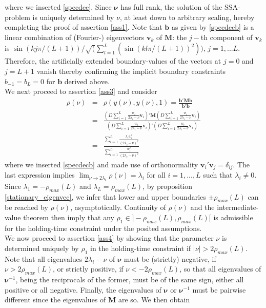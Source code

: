 \documentclass[a4paper]{article}
\begin{document}
where we inserted \ref{specdec}. Since $\boldsymbol{\nu}$ has full rank, the solution of the SSA-problem is uniquely determined by $\nu$, at least down to arbitrary scaling, hereby completing the proof of assertion \ref{ass1}. Note that $\mathbf{b}$ as given by \ref{specdecb} is a linear combination of (Fourier-) eigenvectors $\mathbf{v}_{k}$ of $\mathbf{M}$: the $j-$th component of $\mathbf{v}_k$ is $\sin(kj\pi/(L+1))/\sqrt(\sum_{l=1}^L(\sin(kl\pi/(L+1))^2))$, $j=1,...L$. Therefore, the artificially extended boundary-values of the vectors at $j=0$ and $j=L+1$ vanish thereby confirming the implicit boundary constraints $b_{-1}=b_L=0$ for $\mathbf{b}$ derived above. \\ %
We next proceed to assertion \ref{ass3} and consider
\begin{eqnarray}
\rho(\nu)&=&\rho(y(\nu),y(\nu),1)=\frac{\mathbf{b}'\mathbf{M}\mathbf{b}}{\mathbf{b}'\mathbf{b}}\nonumber\\
&=&\frac{\left(D\sum_{i=1}^L \frac{w_i}{2\lambda_{i }-\nu}\mathbf{v}_i\right)'\mathbf{M}\left(D\sum_{i=1}^L \frac{w_i}{2\lambda_{i }-\nu}\mathbf{v}_i\right)}{\left(D\sum_{i=1}^L \frac{w_i}{2\lambda_{i }-\nu}\mathbf{v}_i\right)'\left(D\sum_{i=1}^L \frac{w_i}{2\lambda_{i }-\nu}\mathbf{v}_i\right)}\nonumber\\
&=&\frac{\sum_{i=1}^L \displaystyle{\frac{\lambda_{i }w_i^2}{(2\lambda_{i }-\nu)^2}}}{\sum_{i=1}^L \displaystyle{\frac{w_i^2}{(2\lambda_{i }-\nu)^2}}}\label{specdecrho}
\end{eqnarray}
where we inserted \ref{specdecb} and made use of orthonormality $\mathbf{v}_i'\mathbf{v}_j=\delta_{ij}$. The last expression implies $\lim_{\nu\to2\lambda_{i }}\rho(\nu)=\lambda_{i }$ for all $i=1,...,L$ such that $\lambda_i\neq 0$. Since  $\lambda_1=-\rho_{max}(L)$ and $\lambda_L=\rho_{max}(L)$, by proposition \ref{stationary_eigenvec}, we infer that lower and upper boundaries $\pm\rho_{max}(L)$ can be reached by $\rho(\nu)$, asymptotically. Continuity of $\rho(\nu)$ and the intermediate-value theorem then imply that any $\rho_1\in ]-\rho_{max}(L),\rho_{max}(L)[$ is admissible for the holding-time constraint under the posited assumptions.\\
We now proceed to assertion \ref{ass4} by showing that the parameter $\nu$ is determined uniquely by $\rho_1$ in the holding-time constraint if $|\nu|>2\rho_{max}(L)$. Note that all eigenvalues $2\lambda_{i}-\nu$ of ${\boldsymbol{\nu}}$ must be (strictly) negative, if $\nu>2\rho_{max}(L)$, or strictly positive, if $\nu<-2\rho_{max}(L)$, so that all eigenvalues of ${\boldsymbol{\nu}}^{-1}$, being the reciprocals of the former, must be of the same sign, either  all positive or all negative. Finally, the eigenvalues of ${\boldsymbol{\nu}}$ or ${\boldsymbol{\nu}}^{-1}$ must be pairwise different since the eigenvalues of ${\mathbf{M}}$ are so. We then obtain
\end{document}
